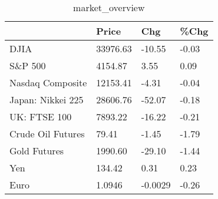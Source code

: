 \documentclass{article}%
\begin{document}
%


\begin{table}[htbp]%
\caption{market\_overview}%
\centering%
\begin{adjustbox}{width=1\textwidth}%
\begin{tabular}{llll}
\toprule
                  &    Price &     Chg &  \%Chg \\
\midrule
             DJIA & 33976.63 &  -10.55 & -0.03 \\
          S\&P 500 &  4154.87 &    3.55 &  0.09 \\
 Nasdaq Composite & 12153.41 &   -4.31 & -0.04 \\
Japan: Nikkei 225 & 28606.76 &  -52.07 & -0.18 \\
     UK: FTSE 100 &  7893.22 &  -16.22 & -0.21 \\
Crude Oil Futures &    79.41 &   -1.45 & -1.79 \\
     Gold Futures &  1990.60 &  -29.10 & -1.44 \\
              Yen &   134.42 &    0.31 &  0.23 \\
             Euro &   1.0946 & -0.0029 & -0.26 \\
\bottomrule
\end{tabular}
%
\end{adjustbox}%
\end{table}

%
\end{document}
